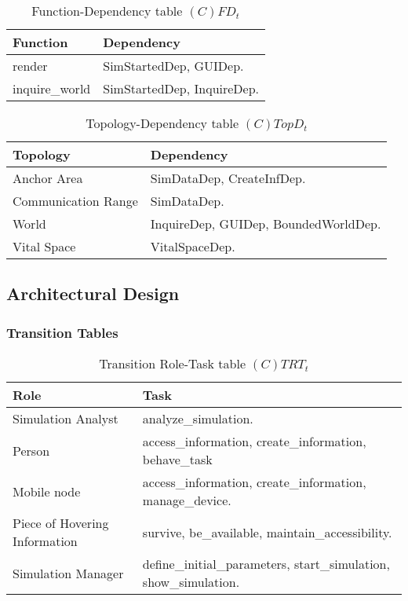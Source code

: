 \begin{table}[H]
	\centering
	\begin{tabular}{|p{5cm}|p{7cm}|}
			\hline
			\textbf{Function} & \textbf{Dependency} \\
			\hline
			render & SimStartedDep, GUIDep. \\
			\hline
			inquire\_world & SimStartedDep, InquireDep. \\
			\hline
		\end{tabular}
	\caption{Function-Dependency table $(C)FD_t$}
	\label{tab:cfdt}
\end{table}

\begin{table}[H]
	\centering
	\begin{tabular}{|p{4cm}|p{8cm}|}
			\hline
			\textbf{Topology} & \textbf{Dependency} \\
			\hline
			Anchor Area & SimDataDep, CreateInfDep.\\
			\hline
			Communication Range & SimDataDep. \\
			\hline
			World & InquireDep, GUIDep, BoundedWorldDep. \\
			\hline
			Vital Space & VitalSpaceDep. \\
			\hline
		\end{tabular}
	\caption{Topology-Dependency table $(C)TopD_t$}
	\label{tab:ctopdt}
\end{table}

\subsection{Architectural Design}

\subsubsection{Transition Tables}

\begin{table}[H]
	\centering
	\begin{tabular}{|p{4cm}|p{8cm}|}
			\hline
			\textbf{Role} & \textbf{Task} \\
			\hline
			Simulation Analyst & analyze\_simulation.   \\
			\hline
			Person & access\_information, create\_information, behave\_task \\
			\hline
			Mobile node & access\_information, create\_information, manage\_device.
			\\
			\hline
			Piece of Hovering Information & survive, be\_available,
			maintain\_accessibility. \\
			\hline
			Simulation Manager & define\_initial\_parameters, start\_simulation, show\_simulation. \\
			\hline
		\end{tabular}
	\caption{Transition Role-Task table $(C)TRT_t$}
	\label{tab:ctrtt}
\end{table}

